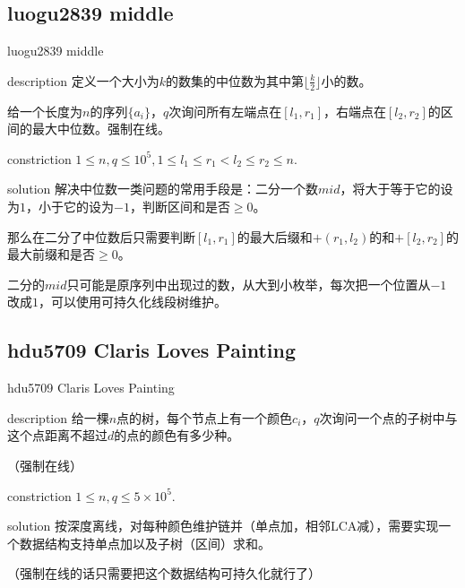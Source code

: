 \documentclass{beamer}
\begin{document}
	\subsection{luogu2839 middle}
	\begin{frame}{luogu2839 middle}
		\begin{block}{description}
			定义一个大小为$k$的数集的中位数为其中第$\lfloor\frac{k}{2}\rfloor$小的数。
			
			给一个长度为$n$的序列$\{a_i\}$，$q$次询问所有左端点在$[l_1,r_1]$，右端点在$[l_2,r_2]$的区间的最大中位数。强制在线。
		\end{block}
		\begin{block}{constriction}
			$1 \le n, q \le 10^5, 1 \le l_1 \le r_1 < l_2 \le r_2 \le n.$
		\end{block}
		\pause
		\begin{block}{solution}
			解决中位数一类问题的常用手段是：二分一个数$mid$，将大于等于它的设为$1$，小于它的设为$-1$，判断区间和是否$\ge 0$。
			
			那么在二分了中位数后只需要判断$[l_1,r_1]$的最大后缀和$+(r_1,l_2)$的和$+[l_2,r_2]$的最大前缀和是否$\ge 0$。
			
			二分的$mid$只可能是原序列中出现过的数，从大到小枚举，每次把一个位置从$-1$改成$1$，可以使用可持久化线段树维护。
		\end{block}
	\end{frame}
	\subsection{hdu5709 Claris Loves Painting}
	\begin{frame}{hdu5709 Claris Loves Painting}
		\begin{block}{description}
			给一棵$n$点的树，每个节点上有一个颜色$c_i$，$q$次询问一个点的子树中与这个点距离不超过$d$的点的颜色有多少种。
			
			（强制在线）
		\end{block}
		\begin{block}{constriction}
			$1 \le n, q \le 5\times 10^5.$
		\end{block}
		\pause
		\begin{block}{solution}
			按深度离线，对每种颜色维护链并（单点加，相邻LCA减），需要实现一个数据结构支持单点加以及子树（区间）求和。
			
			（强制在线的话只需要把这个数据结构可持久化就行了）
		\end{block}
	\end{frame}
\end{document}

